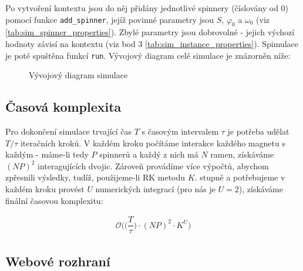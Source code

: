 Po vytvoření kontextu jsou do něj přidány jednotlivé spinnery (číslovány od 0) pomocí funkce \texttt{add\_spinner}, jejíž povinné parametry jsou $S$, $\varphi_0$ a $\omega_0$ (viz \autoref{tab:sim_spinner_properties}). Zbylé parametry jsou dobrovolné - jejich výchozí hodnoty závisí na kontextu (viz bod 3 \autoref{tab:sim_instance_properties}). Spimulace je poté spuštěna funkcí \texttt{run}.
Vývojový diagram celé simulace je znázorněn níže:

\begin{figure}[!ht]
    
    \caption{Vývojový diagram simulace}
    \label{fig:MyLabel}
\end{figure}

\clearpage

\subsection{Časová komplexita}

Pro dokončení simulace trvající čas $T$ s časovým intervalem $\tau$ je potřeba udělat $T/\tau$ iteračních kroků. V každém kroku počítáme interakce každého magnetu s každým - máme-li tedy $P$ spinnerů a každý z nich má $N$ ramen, získáváme $(NP)^2$ interagujících dvojic. Zároveň provádíme více výpočtů, abychom zpřesnili výsledky, tudíž, použijeme-li RK metodu $K$. stupně a potřebujeme v každém kroku provést $U$ numerických integrací (pro nás je $U = 2$), získáváme finální časovou komplexitu:

\begin{equation}
    \label{eq:sim_complexity}
    \begin{gathered}
        \mathcal{O} \bigg( \bigg( \dfrac{T}{\tau} \bigg) \cdot (N P)^2 \cdot K^U \bigg)
    \end{gathered}
\end{equation}

\subsection{Webové rozhraní}